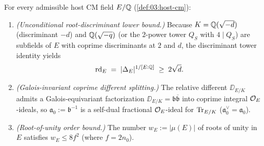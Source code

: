 \begin{lemma}
\label{lem:12:rd-and-diff}
For every admissible host CM field $E/\mathbb{Q}$ (\cref{def:03:host-cm}):
\begin{enumerate}[label=\textup{(\roman*)}]
\item \emph{(Unconditional root-discriminant lower bound.)} Because $K = \mathbb{Q}(\sqrt{-d})$ (discriminant $-d$) and $\mathbb{Q}(\sqrt{-q})$ (or the $2$-power tower $Q_S$ with $4 \mid Q_S$) are subfields of $E$ with coprime discriminants at $2$ and $d$, the discriminant tower identity yields
  \begin{equation}
  \label{eq:12:rd-lower}
    \mathrm{rd}_E \;=\; |\Delta_E|^{1/[E:\mathbb{Q}]} \;\ge\; 2\sqrt{d}.
  \end{equation}
\item \emph{(Galois-invariant coprime different splitting.)} The relative different $\DD_{E/K}$ admits a Galois-equivariant factorization $\DD_{E/K} = \mathfrak{b}\overline{\mathfrak{b}}$ into coprime integral $\mathcal{O}_E$-ideals, so $\mathfrak{a}_0 := \mathfrak{b}^{-1}$ is a self-dual fractional $\mathcal{O}_E$-ideal for $\operatorname{Tr}_{E/K}$ ($\mathfrak{a}_0^\vee = \mathfrak{a}_0$).
\item \emph{(Root-of-unity order bound.)} The number $w_E := |\mu(E)|$ of roots of unity in $E$ satisfies $w_E \le 8 f^2$ (where $f = 2 n_0$).
\end{enumerate}
\end{lemma}

